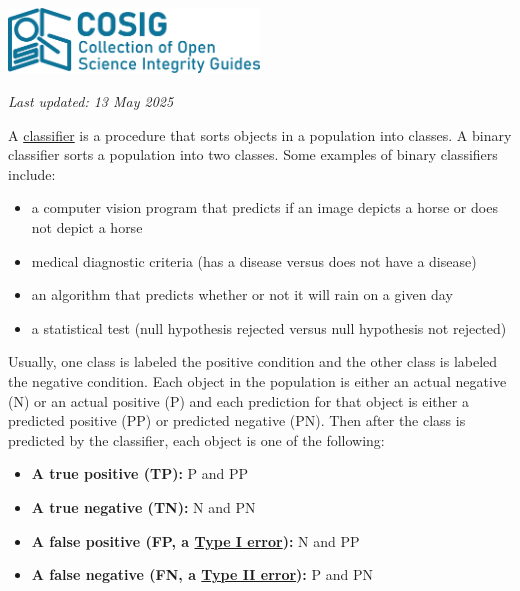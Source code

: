 \documentclass[letterpaper, 12pt]{article}
\begin{document}
\flushleft\includegraphics[width=0.5\textwidth]{img/home/241017_final_logo_mockup.png}

\textit{Last updated: 13 May 2025}

A \href{https://en.wikipedia.org/wiki/Classification_rule}{classifier} is a procedure that sorts objects in a population into classes. A binary classifier sorts a population into two classes. Some examples of binary classifiers include:

\begin{itemize}
    \setlength\itemsep{-0.5em}
    \item a computer vision program that predicts if an image depicts a horse or does not depict a horse
    \item medical diagnostic criteria (has a disease versus does not have a disease)
    \item an algorithm that predicts whether or not it will rain on a given day
    \item a statistical test (null hypothesis rejected versus null hypothesis not rejected)
\end{itemize}

Usually, one class is labeled the positive condition and the other class is labeled the negative condition. Each object in the population is either an actual negative (N) or an actual positive (P) and each prediction for that object is either a predicted positive (PP) or predicted negative (PN). Then after the class is predicted by the classifier, each object is one of the following:

\begin{itemize}
    \setlength\itemsep{-0.5em}
    \item \textbf{A true positive (TP):} P and PP
    \item \textbf{A true negative (TN):} N and PN
    \item \textbf{A false positive (FP, a \href{https://en.wikipedia.org/wiki/Type_I_and_type_II_errors}{Type I error}):} N and PP
    \item \textbf{A false negative (FN, a \href{https://en.wikipedia.org/wiki/Type_I_and_type_II_errors}{Type II error}):} P and PN
\end{itemize}
\end{document}
